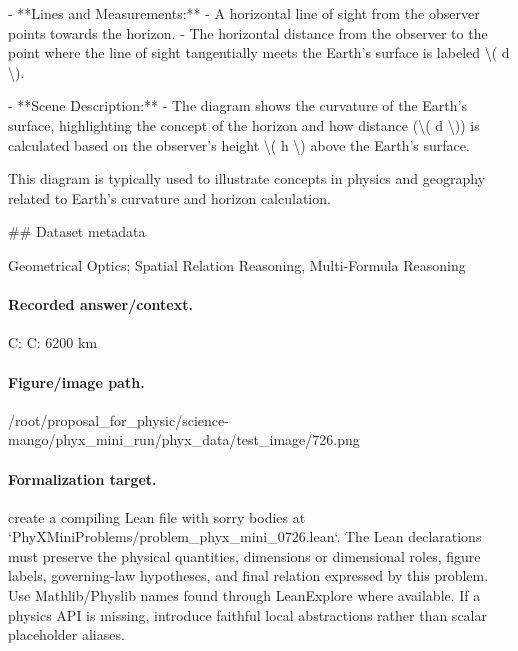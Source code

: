 - **Lines and Measurements:**
  - A horizontal line of sight from the observer points towards the horizon.
  - The horizontal distance from the observer to the point where the line of sight tangentially meets the Earth's surface is labeled \textbackslash{}( d \textbackslash{}).

- **Scene Description:**
  - The diagram shows the curvature of the Earth's surface, highlighting the concept of the horizon and how distance (\textbackslash{}( d \textbackslash{})) is calculated based on the observer's height \textbackslash{}( h \textbackslash{}) above the Earth's surface.

This diagram is typically used to illustrate concepts in physics and geography related to Earth's curvature and horizon calculation.

\#\# Dataset metadata

Geometrical Optics; Spatial Relation Reasoning, Multi-Formula Reasoning

\paragraph{Recorded answer/context.}
C: C: 6200 km

\paragraph{Figure/image path.}
/root/proposal\_for\_physic/science-mango/phyx\_mini\_run/phyx\_data/test\_image/726.png

\paragraph{Formalization target.}
create a compiling Lean file with sorry bodies at `PhyXMiniProblems/problem\_phyx\_mini\_0726.lean`. The Lean declarations must preserve the physical quantities, dimensions or dimensional roles, figure labels, governing-law hypotheses, and final relation expressed by this problem.
Use Mathlib/Physlib names found through LeanExplore where available. If a physics API is missing, introduce faithful local abstractions rather than scalar placeholder aliases.

